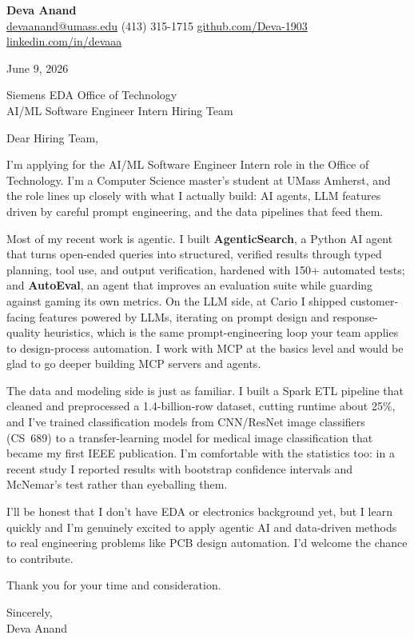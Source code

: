 \documentclass[letterpaper,11pt]{article}
\begin{document}
\begin{center}
  {\LARGE \bfseries \textcolor{ResumeNavy}{Deva Anand}} \\[3pt]
  {\small
  \href{mailto:devaanand@umass.edu}{devaanand@umass.edu} \enspace\textbar\enspace
  (413) 315-1715 \enspace\textbar\enspace
  \href{https://github.com/Deva-1903}{github.com/Deva-1903} \enspace\textbar\enspace
  \href{https://linkedin.com/in/devaaa/}{linkedin.com/in/devaaa}}
\end{center}
\vspace{6pt}

June 9, 2026

\vspace{2pt}
Siemens EDA \textemdash{} Office of Technology \\
AI/ML Software Engineer Intern Hiring Team

\vspace{6pt}
Dear Hiring Team,

I'm applying for the AI/ML Software Engineer Intern role in the Office of Technology. I'm a Computer Science master's student at UMass Amherst, and the role lines up closely with what I actually build: AI agents, LLM features driven by careful prompt engineering, and the data pipelines that feed them.

Most of my recent work is agentic. I built \textbf{AgenticSearch}, a Python AI agent that turns open-ended queries into structured, verified results through typed planning, tool use, and output verification, hardened with 150+ automated tests; and \textbf{AutoEval}, an agent that improves an evaluation suite while guarding against gaming its own metrics. On the LLM side, at Cario I shipped customer-facing features powered by LLMs, iterating on prompt design and response-quality heuristics, which is the same prompt-engineering loop your team applies to design-process automation. I work with MCP at the basics level and would be glad to go deeper building MCP servers and agents.

The data and modeling side is just as familiar. I built a Spark ETL pipeline that cleaned and preprocessed a 1.4-billion-row dataset, cutting runtime about 25\%, and I've trained classification models from CNN/ResNet image classifiers (CS~689) to a transfer-learning model for medical image classification that became my first IEEE publication. I'm comfortable with the statistics too: in a recent study I reported results with bootstrap confidence intervals and McNemar's test rather than eyeballing them.

I'll be honest that I don't have EDA or electronics background yet, but I learn quickly and I'm genuinely excited to apply agentic AI and data-driven methods to real engineering problems like PCB design automation. I'd welcome the chance to contribute.

\vspace{4pt}
Thank you for your time and consideration.

\vspace{8pt}
Sincerely, \\
Deva Anand
\end{document}

